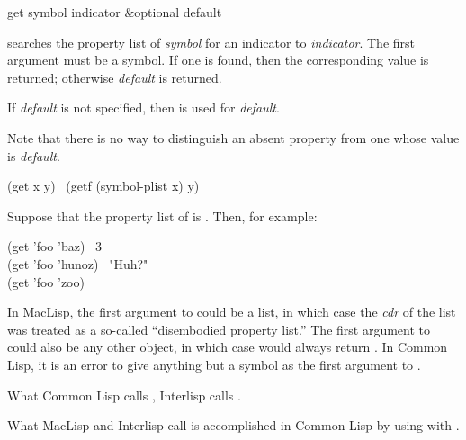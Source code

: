 \begin{defun}[Function]
get symbol indicator &optional default

 searches the property list of
\emph{symbol} for an indicator  to \emph{indicator}.
The first argument must be a symbol.
If one is found, then the corresponding value is returned;
otherwise \emph{default} is returned.

If \emph{default} is not specified,
then {\false} is used for \emph{default}.

Note that there is no way to distinguish an absent property from
one whose value is \emph{default}.
\begin{lisp}
(get x y) \EQ\ (getf (symbol-plist x) y)
\end{lisp}
Suppose that the property list of  is .
Then, for example:
\begin{lisp}
(get 'foo 'baz) \EV\ 3 \\
(get 'foo 'hunoz) \EV\ "Huh?" \\
(get 'foo 'zoo) \EV\ {\false}
\end{lisp}
\beforenoterule
\begin{incompatibility}
In MacLisp, the first argument to  could
be a list, in which case the \emph{cdr} of the list was treated
as a so-called ``disembodied property list.''
The first argument to 
could also be any other object, in which case  would 
always return {\nil}.  In Common Lisp, it is an error to give anything
but a symbol as the first argument to .

What Common Lisp calls , Interlisp calls .

What MacLisp and Interlisp call  is accomplished
in Common Lisp by using  with .
\end{incompatibility}
\afternoterule


\end{defun}
